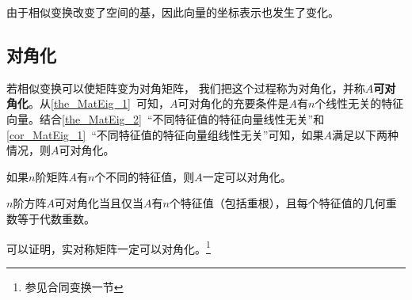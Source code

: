 由于相似变换改变了空间的基，因此向量的坐标表示也发生了变化。
\subsection{对角化}

若相似变换可以使矩阵变为对角矩阵， 我们把这个过程称为对角化，并称$A$\textbf{可对角化}。从\autoref{the_MatEig_1}~可知，$A$可对角化的充要条件是$A$有$n$个线性无关的特征向量。结合\autoref{the_MatEig_2}~“不同特征值的特征向量线性无关”和\autoref{cor_MatEig_1}~“不同特征值的特征向量组线性无关”可知，如果$A$满足以下两种情况，则$A$可对角化。
\begin{corollary}{}
如果$n$阶矩阵$A$有$n$个不同的特征值，则$A$一定可以对角化。
\end{corollary}
\begin{corollary}{}
$n$阶方阵$A$可对角化当且仅当$A$有$n$个特征值（包括重根），且每个特征值的几何重数等于代数重数。
\end{corollary}



可以证明，实对称矩阵一定可以对角化。\footnote{参见合同变换一节}

